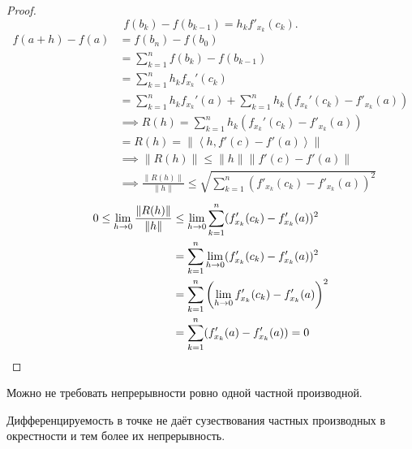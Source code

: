 \begin{theorem}
\begin{proof}
        \[ f(b_{k}) - f(b_{k-1}) = h_{k}f'_{x_{k}}(c_{k}) .\]
        \begin{equation*}
            \begin{split}
                f(a+h) - f(a)
                &= f(b_{n}) - f(b_0)\\
                &= \sum\limits_{k=1}^{n} f(b_{k}) - f(b_{k-1})\\
                &= \sum\limits_{k=1}^{n} h_{k}f_{x_{k}}'(c_{k})\\
                &= \sum\limits_{k=1}^{n} h_{k}f_{x_{k}}'(a) + \sum\limits_{k=1}^{n} h_{k}(f_{x_{k}}'(c_{k}) - f'_{x_{k}}(a))\\
                &\implies R(h) = \sum\limits_{k=1}^{n} h_{k}(f_{x_{k}}'(c_{k}) - f'_{x_{k}}(a))\\
                &= R(h) = \|\left<h, f'(c) - f'(a)\right>\|\\
                &\implies \|R(h)\| \le \|h\|\|f'(c) - f'(a)\|\\
                &\implies \frac{\|R(h)\|}{\|h\|} \le  \sqrt{\sum\limits_{k=1}^{n} (f'_{x_{k}}(c_{k})-f'_{x_{k}}(a))^2} 
            \end{split}
        \end{equation*}
        \begin{equation*}
            \begin{split}
                    0 \le \lim\limits_{h \to 0} \frac{\|R(h)\|}{\|h\|} 
                    &\le \lim\limits_{h \to 0} \sum\limits_{k=1}^{n} (f'_{x_{k}}(c_{k}) - f'_{x_{k}}(a))^2\\ 
                    &= \sum\limits_{k=1}^{n} \lim\limits_{h \to 0} (f'_{x_{k}}(c_{k}) - f'_{x_{k}}(a))^2\\
                    &= \sum\limits_{k=1}^{n} \left(\lim\limits_{h \to 0} f'_{x_{k}}(c_{k}) - f'_{x_{k}}(a)  \right)^2\\
                    &= \sum\limits_{k=1}^{n} (f'_{x_{k}}(a) - f'_{x_{k}}(a)) = 0 \qedhere
            \end{split}
        \end{equation*}
    \end{proof}
\end{theorem}

\begin{remark} \thmslashn

    Можно не требовать непрерывности ровно одной частной производной.
\end{remark}
\begin{remark} \thmslashn

    Дифференцируемость в точке не даёт сузествования частных производных в окрестности и тем более их непрерывность.
\end{remark}
